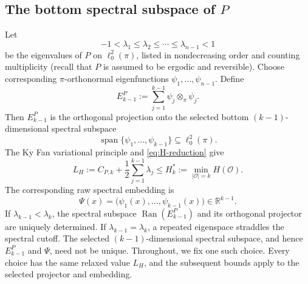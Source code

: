 \documentclass[11pt]{article}
\newcommand{\1}{\mathbf{1}}
\begin{document}
\subsection{The bottom spectral subspace of
	\texorpdfstring{$P$}{P}}

Let
\[
-1<\lambda_1\leq\lambda_2\leq\cdots
\leq\lambda_{n-1}<1
\]
be the eigenvalues of $P$ on $\ell^2_0(\pi)$, listed in
nondecreasing order and counting multiplicity (recall that $P$ is assumed to be ergodic and reversible).  Choose corresponding
$\pi$-orthonormal eigenfunctions
$\psi_1,\ldots,\psi_{n-1}$.  Define
\begin{equation*}
	E_{k-1}^P
	:=\sum_{j=1}^{k-1}\psi_j\otimes_\pi\psi_j.
\end{equation*}
Then $E_{k-1}^P$ is the orthogonal projection onto the selected
bottom $(k-1)$-dimensional spectral subspace
\[
\operatorname{span}\{\psi_1,\ldots,\psi_{k-1}\}
\subseteq\ell^2_0(\pi).
\]
The Ky Fan variational principle \citep{Fan1951} and
\eqref{eq:H-reduction} give
\begin{equation}
	L_H
	:=C_{P,k}+\frac12\sum_{j=1}^{k-1}\lambda_j
	\leq
	H_k^*
	:=\min_{|\mathcal O|=k}H(\mathcal O).
	\label{eq:H-relaxed-lower-bound}
\end{equation}
The corresponding raw spectral embedding is
\begin{equation}
	\Psi(x)
	=\bigl(\psi_1(x),\ldots,\psi_{k-1}(x)\bigr)
	\in\mathbb R^{k-1}.
	\label{eq:P-spectral-embedding}
\end{equation}
If $\lambda_{k-1}<\lambda_k$, the spectral subspace
$\operatorname{Ran}(E_{k-1}^P)$ and its orthogonal projector are
uniquely determined. If $\lambda_{k-1}=\lambda_k$, a repeated eigenspace straddles the
spectral cutoff.  The selected $(k-1)$-dimensional spectral subspace,
and hence $E_{k-1}^P$ and $\Psi$, need not be unique.  Throughout, we
fix one such choice.  Every choice has the same relaxed value $L_H$,
and the subsequent bounds apply to the selected projector and
embedding.
\end{document}
